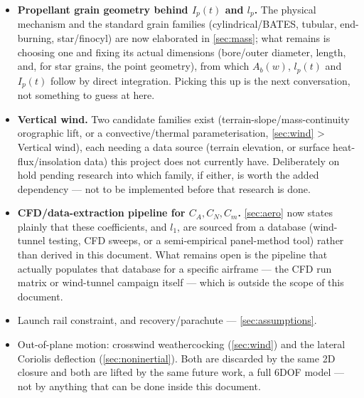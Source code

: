 \documentclass[10pt]{extarticle}
\numberwithin{equation}{subsection}
\begin{document}
\begin{itemize}
    value (forced-oscillation wind-tunnel testing, or unsteady CFD) or a full distributed-force
    derivation from the airframe geometry of the previous item.
    \item \textbf{Propellant grain geometry behind $I_p(t)$ and $l_p$.} The physical mechanism and
    the standard grain families (cylindrical/BATES, tubular, end-burning, star/finocyl) are now
    elaborated in \autoref{sec:mass}; what remains is choosing one and fixing its actual
    dimensions (bore/outer diameter, length, and, for star grains, the point geometry), from which
    $A_b(w)$, $l_p(t)$ and $I_p(t)$ follow by direct integration. Picking this up is the next
    conversation, not something to guess at here.
    \item \textbf{Vertical wind.} Two candidate families exist (terrain-slope/mass-continuity
    orographic lift, or a convective/thermal parameterisation, \autoref{sec:wind} > Vertical
    wind), each needing a data source (terrain elevation, or surface heat-flux/insolation data)
    this project does not currently have. Deliberately on hold pending research into which family,
    if either, is worth the added dependency --- not to be implemented before that research is
    done.
    \item \textbf{CFD/data-extraction pipeline for $C_A,C_N,C_m$.} \autoref{sec:aero} now states
    plainly that these coefficients, and $l_1$, are sourced from a database (wind-tunnel testing,
    CFD sweeps, or a semi-empirical panel-method tool) rather than derived in this document. What
    remains open is the pipeline that actually populates that database for a specific airframe ---
    the CFD run matrix or wind-tunnel campaign itself --- which is outside the scope of this
    document.
    \item Launch rail constraint, and recovery/parachute --- \autoref{sec:assumptions}.
    \item Out-of-plane motion: crosswind weathercocking (\autoref{sec:wind}) and the lateral
    Coriolis deflection (\autoref{sec:noninertial}). Both are discarded by the same 2D closure and
    both are lifted by the same future work, a full 6DOF model --- not by anything that can be
    done inside this document.
\end{itemize}
\end{document}
